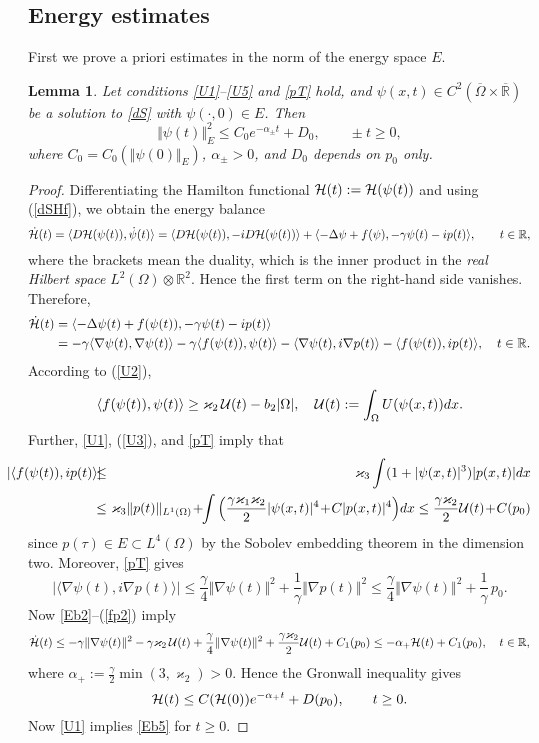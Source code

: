 \documentclass[11pt]{article}
\newtheorem{lemma}[theorem]{Lemma}
\newcommand{\fr}{\frac}
\newcommand{\R}{{\mathbb R}}
\newcommand{\cH}{{\cal H}}
\newcommand{\al}{\alpha}
\newcommand{\De}{\Delta}
\newcommand{\vka}{\varkappa}
\newcommand{\ga}{\gamma}
\newcommand{\Om}{\Omega}
\newcommand{\na}{\nabla}
\newcommand{\ov}{\overline}
\newcommand{\5}{{\hspace{0.5mm}}}
\numberwithin{equation}{section}
\newcommand{\la}{\label}
\newcommand{\be}{\begin{equation}}
\newcommand{\ee}{\end{equation}}
\newcommand{\beqn}{\begin{eqnarray}}
\newcommand{\eeqn}{\end{eqnarray}}
\newcommand{\bl}{\begin{lemma}}
\newcommand{\el}{\end{lemma}}
\numberwithin{equation}{section}
\begin{document}
\subsection{Energy estimates}
First we prove a priori estimates in the norm of the energy space $E$.
\bl\la{l1}
Let conditions {\rm \eqref{U1}--\eqref{U5}} and {\rm\eqref{pT}} hold,
and $\psi(x,t)\in C^2(\ov\Om\times\ov\R)$ be a solution to \eqref{dS} with $\psi(\cdot,0)\in E$. Then
\be\la{Eb5}
\Vert\psi(t) \Vert_E^2 \le C_0 e^{-\al_\pm t}+D_0,\qquad \pm t \ge 0,
\ee
where $C_0=C_0(\Vert\psi(0)\Vert_E)$, $\al_\pm>0$, and $D_0$ depends on $p_0$ only.
\el
\begin{proof}
Differentiating the Hamilton functional $\cH(t):=\cH(\psi(t))$
and using (\ref{dSHf}), we obtain
the energy balance
\be\la{ebal}
\dot\cH (t)=\langle D\cH(\psi(t)),\dot\psi(t)\rangle=\langle D\cH(\psi(t)),-i D\cH(\psi(t))\rangle+\langle - \De \psi+f(\psi),-\ga \psi(t)-i p(t)\rangle,\qquad t\in\R,
\ee
where the brackets mean the duality, which is the inner product in the {\it real Hilbert space}
$L^2(\Om)\otimes\R^2$.
Hence the first term on the right-hand side vanishes. Therefore,
\begin{align}
\dot\cH (t)&=\langle - \De \psi(t)+f(\psi(t)),-\ga \psi(t)-i p( t)\rangle
\nonumber\\
&=-\ga\langle \na \psi(t),\na\psi(t)\rangle-\ga\langle f(\psi(t)), \psi(t)\rangle
-\langle \na \psi(t),i\na p(t)\rangle-\langle f(\psi(t)), ip(t)\rangle,\quad t\in\R.
\end{align}\la{Eb2}
According to (\ref{U2}),
\be\la{Eb3}
\langle f(\psi(t)), \psi(t)\rangle\ge \vka_2\,{\cal U}(t)-b_2|\Omega|,\quad {\cal U}(t):=\int_{\Omega} U(\psi(x,t))dx.
\ee
Further, \eqref{U1}, (\ref{U3}), and \eqref{pT} imply that
\beqn \nonumber\la{fp3}
\!\!\!\!\!\!\!\!\!\!
|\langle f(\psi(t)), ip(t)\rangle| \!\!&\!\!\le\!\!&\!\!\vka_3\int (1+|\psi(x,t)|^{3})|p(x, t)| dx\\
\!\!&\!\!\le\!\!&\!\! \vka_3\Vert p( t)\Vert_{L^1(\Om)}\!+ \!\!\int \Big(\frac{\ga\vka_1\vka_2}2|\psi(x,t)|^{4}\!+\!C|p(x, t)|^{4}\Big) dx
\le \fr{\ga\vka_2}{2}{\cal U}(t)\!+\!C(p_0)
\eeqn
since $p(\tau)\in E \subset L^{4}(\Om)$ by the Sobolev embedding theorem in the dimension two. Moreover, \eqref{pT} gives
\be\la{fp2}
 |\langle \na \psi(t),i\na p( t)\rangle|\le \fr\ga4 \Vert\na \psi(t)\Vert^2+
 \fr1{\ga}\Vert \na p( t)\Vert^2 \le \frac{\ga}4\Vert\na \psi(t)\Vert^2 + \fr1{\ga}\,p_0.
\ee
Now \eqref{Eb2}--(\ref{fp2}) imply
\be\la{dcH}
\dot\cH (t) \le -\ga\Vert \nabla\psi(t)\Vert^2-\ga\vka_2\, {\cal U}(t)+\fr\ga4 \Vert\na \psi(t)\Vert^2+\fr{\ga\vka_2}2 {\cal U}(t)+C_1(p_0)
\le -\al_+\cH (t)+C_1(p_0),\quad t\in\R,
\ee
where $\al_+:=\fr {\ga}2\min(3,\vka_2)>0$.
 Hence the Gronwall inequality gives
\be\la{Eb4}
\cH (t)\le C(\cH(0))e^{-\al_+ t}+D(p_0),\qquad t\ge 0.
\ee
Now
 \eqref{U1}
implies \eqref{Eb5} for $t\ge 0$.
\smallskip


\end{proof}
\end{document}
